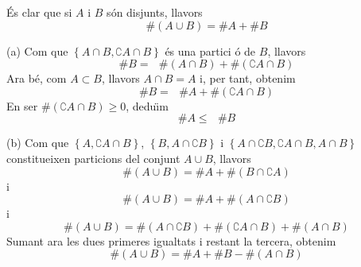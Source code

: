 \begin{solucio}
\'{E}s clar que si $A$ i $B$ s\'{o}n disjunts, llavors%
\begin{equation*}
\#\left( A\cup B\right) =\#A+\#B
\end{equation*}

(a) Com que $\left\{ A\cap B,\complement A\cap B\right\} $ \'{e}s una partici%
\'{o} de $B$, llavors%
\begin{equation*}
\#B=\text{ }\#\left( A\cap B\right) +\#\left( \complement A\cap B\right)
\end{equation*}%
Ara b\'{e}, com $A\subset B$, llavors $A\cap B=A$ i, per tant, obtenim%
\begin{equation*}
\#B=\text{ }\#A+\#\left( \complement A\cap B\right)
\end{equation*}%
En ser $\#\left( \complement A\cap B\right) \geq 0$, dedu\"{\i}m%
\begin{equation*}
\#A\leq \text{ }\#B
\end{equation*}

(b) Com que $\left\{ A,\complement A\cap B\right\} $, $\left\{ B,A\cap
\complement B\right\} $ i $\left\{ A\cap \complement B,\complement A\cap
B,A\cap B\right\} $ constitueixen particions del conjunt $A\cup B$, llavors%
\begin{equation*}
\#\left( A\cup B\right) =\#A+\#\left( B\cap \complement A\right)
\end{equation*}%
i%
\begin{equation*}
\#\left( A\cup B\right) =\#A+\#\left( A\cap \complement B\right)
\end{equation*}%
i%
\begin{equation*}
\#\left( A\cup B\right) =\#\left( A\cap \complement B\right) +\#\left(
\complement A\cap B\right) +\#\left( A\cap B\right)
\end{equation*}%
Sumant ara les dues primeres igualtats i restant la tercera, obtenim%
\begin{equation*}
\#\left( A\cup B\right) =\#A+\#B-\#\left( A\cap B\right)
\end{equation*}


\end{solucio}
